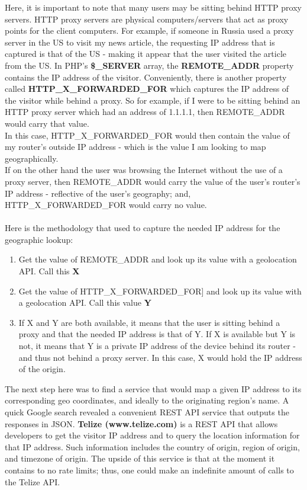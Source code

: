 \documentclass[12pt]{article}
\begin{document}
Here, it is important to note that many users may be sitting behind HTTP proxy servers. HTTP proxy servers are physical computers/servers that act as proxy points for the client computers. For example, if someone in Russia used a proxy server in the US to visit my news article, the requesting IP address that is captured is that of the US - making it appear that the user visited the article from the US. In PHP's \textbf{\$\_SERVER} array, the \textbf{REMOTE\_ADDR} property contains the IP address of the visitor. Conveniently, there is another property called \textbf{HTTP\_X\_FORWARDED\_FOR} which captures the IP address of the visitor while behind a proxy. So for example, if I were to be sitting behind an HTTP proxy server which had an address of 1.1.1.1, then REMOTE\_ADDR would carry that value. \\
In this case, HTTP\_X\_FORWARDED\_FOR would then contain the value of my router's outside IP address - which is the value I am looking to map geographically. \\  
If on the other hand the user was browsing the Internet without the use of a proxy server, then REMOTE\_ADDR would carry the value of the user's router's IP address - reflective of the user's geography; and, \\ HTTP\_X\_FORWARDED\_FOR would carry no value. \\ \\
\noindent Here is the methodology that used to capture the needed IP address for the geographic lookup:
\begin{enumerate}
\item Get the value of REMOTE\_ADDR and look up its value with a geolocation API. Call this \textbf{X}
\item Get the value of HTTP\_X\_FORWARDED\_FOR] and look up its value with a geolocation API. Call this value \textbf{Y}
\item If X and Y are both available, it means that the user is sitting behind a proxy and that the needed IP address is that of Y. If X is available but Y is not, it means that Y is a private IP address of the device behind its router - and thus not behind a proxy server. In this case, X would hold the IP address of the origin.
\end{enumerate} 

The next step here was to find a service that would map a given IP address to its corresponding geo coordinates, and ideally to the originating region's name. A quick Google search revealed a convenient REST API service that outputs the responses in JSON. \textbf{Telize (www.telize.com)} is a REST API that allows developers to get the visitor IP address and to query the location information for that IP address. Such information includes the country of origin, region of origin, and timezone of origin. The upside of this service is that at the moment it contains to no rate limits; thus, one could make an indefinite amount of calls to the Telize API.
\end{document}
